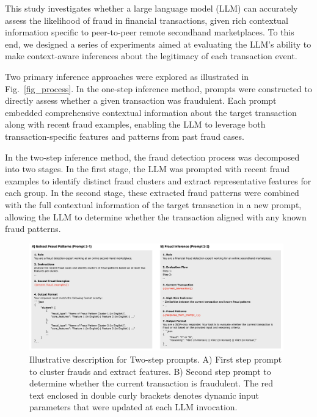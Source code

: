 \documentclass[sigconf]{acmart}
\begin{document}
This study investigates whether a large language model (LLM) can accurately assess the likelihood of fraud in financial transactions, given rich contextual information specific to peer-to-peer remote secondhand marketplaces. To this end, we designed a series of experiments aimed at evaluating the LLM’s ability to make context-aware inferences about the legitimacy of each transaction event.

Two primary inference approaches were explored as illustrated in Fig.~\ref{fig_process}. In the one-step inference method, prompts were constructed to directly assess whether a given transaction was fraudulent. Each prompt embedded comprehensive contextual information about the target transaction along with recent fraud examples, enabling the LLM to leverage both transaction-specific features and patterns from past fraud cases.

In the two-step inference method, the fraud detection process was decomposed into two stages. In the first stage, the LLM was prompted with recent fraud examples to identify distinct fraud clusters and extract representative features for each group. In the second stage, these extracted fraud patterns were combined with the full contextual information of the target transaction in a new prompt, allowing the LLM to determine whether the transaction aligned with any known fraud patterns.


\begin{figure}[t!]
  \centering
  \includegraphics[width=0.98\textwidth]{./figures/fig_prompt_2step.png}
  \caption{Illustrative description for Two-step prompts. A) First step prompt to cluster frauds and extract features. B) Second step prompt to determine whether the current transaction is fraudulent. The red text enclosed in double curly brackets denotes dynamic input parameters that were updated at each LLM invocation.}
  \label{fig_prompt_2step}
\end{figure}
\end{document}
